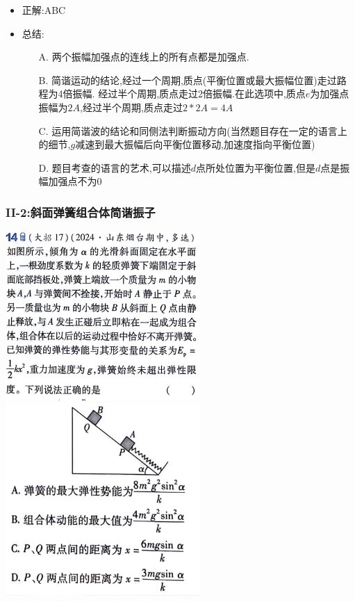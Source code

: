\documentclass{article}
\begin{document}
\begin{itemize}
    \item 正解:\quad ABC
    \item 总结:\quad
          \begin{itemize}
              \item[A.] 两个振幅加强点的连线上的所有点都是加强点.
              \item[B.] 简谐运动的结论,经过一个周期,质点(平衡位置或最大振幅位置)走过路程为4倍振幅.
                  经过半个周期,质点走过2倍振幅.在此选项中,质点$e$为加强点振幅为$2A$,经过半个周期,质点走过$2*2A = 4A$
              \item[C.] 运用简谐波的结论和同侧法判断振动方向(当然题目存在一定的语言上的细节,$g$减速到最大振幅后向平衡位置移动,加速度指向平衡位置)
              \item[D.] 题目考查的语言的艺术,可以描述$d$点所处位置为平衡位置,但是$d$点是振幅加强点不为$0$
          \end{itemize}
\end{itemize}

\vspace{2em}

\subsubsection{II-2:斜面弹簧组合体简谐振子}
\includegraphics[width = 20em]{./pictures/2.1-7.png}
\hspace{2em}
\includegraphics[width = 20em]{./pictures/2.1-8.png}
\end{document}
